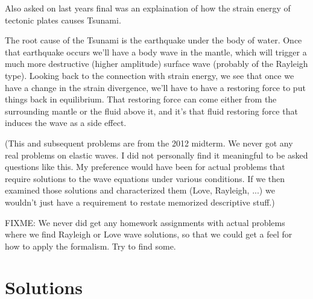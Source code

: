 \begin{Exercise}[title={Tsunami.}, label={problem:elastic:displacements:exampractiseTsunami}]
Also asked on last years final was an explaination of how the strain energy of tectonic plates causes Tsunami.
\end{Exercise}
\begin{Answer}[ref={problem:elastic:displacements:exampractiseTsunami}]
The root cause of the Tsunami is the earthquake under the body of water.  Once that earthquake occurs we'll have a body wave in the mantle, which will trigger a much more destructive (higher amplitude) surface wave (probably of the Rayleigh type).  Looking back to the connection with strain energy, we see that once we have a change in the strain divergence, we'll have to have a restoring force to put things back in equilibrium.  That restoring force can come either from the surrounding mantle or the fluid above it, and it's that fluid restoring force that induces the wave as a side effect.
\end{Answer}

(This and subsequent problems are from the 2012 midterm.  We never got any real problems on elastic waves.  I did not personally find it meaningful to be asked questions like this.  My preference would have been for actual problems that require solutions to the wave equations under various conditions.  If we then examined those solutions and characterized them (Love, Rayleigh, ...) we wouldn't just have a requirement to restate memorized descriptive stuff.)

\begin{Exercise}[title={Wave equation solutions}, label={problem:elastic:displacements:placeholderWaveEquation}]
FIXME: We never did get any homework assignments with actual problems where we find Rayleigh or Love wave solutions, so that we could get a feel for how to apply the formalism.  Try to find some.
\end{Exercise}

\section{Solutions}

\shipoutAnswer
